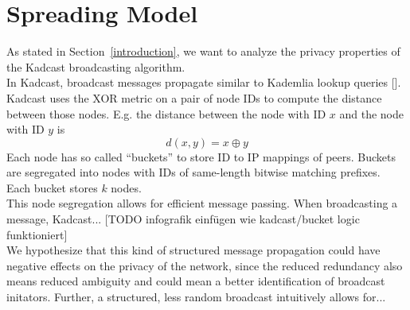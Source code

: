 \section{Spreading Model\label{spreading_model}}
As stated in Section~\ref{introduction}, we want to analyze the privacy
properties of the Kadcast broadcasting algorithm. \\
In Kadcast, broadcast messages propagate similar to Kademlia lookup queries
[]. \\
Kadcast uses the XOR metric on a pair of node IDs to compute the distance
between those nodes. E.g. the distance between the node with ID $x$ and
the node with ID $y$ is
$$d(x, y) = x \oplus y$$
Each node has so called ``buckets'' to store ID to IP mappings of peers.
Buckets are segregated into nodes with IDs of same-length bitwise matching
prefixes.
Each bucket stores $k$ nodes. \\
This node segregation allows for efficient message passing.
When broadcasting a message, Kadcast... [TODO infografik einfügen
wie kadcast/bucket logic funktioniert] \\

We hypothesize that this kind of structured message propagation could
have negative effects on the privacy of the network, since the reduced
redundancy also means reduced ambiguity and could mean a better
identification of broadcast initators. Further, a structured, less
random broadcast intuitively allows for...
